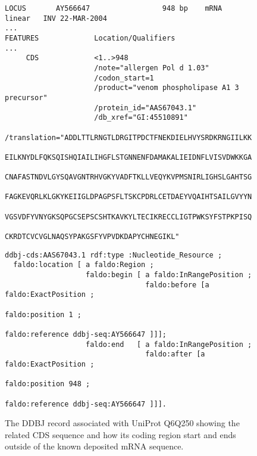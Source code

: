 \begin{figure}
\begin{shaded}
\small
\begin{verbatim}
LOCUS       AY566647                 948 bp    mRNA    linear   INV 22-MAR-2004
...
FEATURES             Location/Qualifiers
...
     CDS             <1..>948
                     /note="allergen Pol d 1.03"
                     /codon_start=1
                     /product="venom phospholipase A1 3 precursor"
                     /protein_id="AAS67043.1"
                     /db_xref="GI:45510891"
                     /translation="ADDLTTLRNGTLDRGITPDCTFNEKDIELHVYSRDKRNGIILKK
                     EILKNYDLFQKSQISHQIAILIHGFLSTGNNENFDAMAKALIEIDNFLVISVDWKKGA
                     CNAFASTNDVLGYSQAVGNTRHVGKYVADFTKLLVEQYKVPMSNIRLIGHSLGAHTSG
                     FAGKEVQRLKLGKYKEIIGLDPAGPSFLTSKCPDRLCETDAEYVQAIHTSAILGVYYN
                     VGSVDFYVNYGKSQPGCSEPSCSHTKAVKYLTECIKRECCLIGTPWKSYFSTPKPISQ
                     CKRDTCVCVGLNAQSYPAKGSFYVPVDKDAPYCHNEGIKL"
\end{verbatim}
\begin{verbatim}
ddbj-cds:AAS67043.1 rdf:type :Nucleotide_Resource ;
  faldo:location [ a faldo:Region ;
                   faldo:begin [ a faldo:InRangePosition ;
                                 faldo:before [a faldo:ExactPosition ;
                                              faldo:position 1 ;
                                              faldo:reference ddbj-seq:AY566647 ]]];
                   faldo:end   [ a faldo:InRangePosition ;
                                 faldo:after [a faldo:ExactPosition ;
                                              faldo:position 948 ;
                                              faldo:reference ddbj-seq:AY566647 ]]].
\end{verbatim}
\end{shaded}
\caption{The DDBJ record associated with UniProt Q6Q250 showing the related CDS sequence and how its coding region start and ends outside of the known deposited mRNA sequence.}
\label{fig:DDBJ}
\end{figure}



